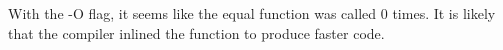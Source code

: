 With the -O flag, it seems like the equal function was called 0 times.
It is likely that the compiler inlined the function to produce faster code.
